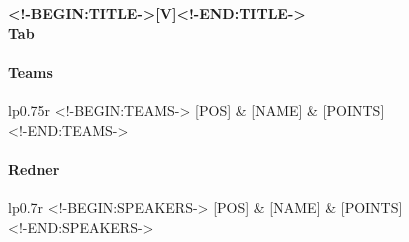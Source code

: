 \documentclass[ngerman,twocolumn,paper=a4,12pt]{scrartcl}
\begin{document}
\begin{center}
  \bfseries\huge{}
  <!-BEGIN:TITLE->[V]<!-END:TITLE->\\
  Tab
\end{center}
\paragraph{Teams}
\begin{center}
  \begin{supertabular}{lp{0.75\linewidth}r}
    \toprule
    <!-BEGIN:TEAMS->
    [POS] & [NAME] \vspace{-0.5em}  & \makebox[0pt][r]{$^{\text{\emph{[BREAKMARK]}}}$} [POINTS]\\
    <!-END:TEAMS->
    \bottomrule
  \end{supertabular}
\end{center}

\paragraph{Redner}
\begin{center}
  \begin{supertabular}{lp{0.7\linewidth}r}
    \toprule
    <!-BEGIN:SPEAKERS->
    [POS] & [NAME] \vspace{-0.5em}  & \makebox[0pt][r]{$^{\text{\emph{[BREAKMARK]}}}$} [POINTS] \\
    <!-END:SPEAKERS->
    \bottomrule
  \end{supertabular}
\end{center}
\end{document}
